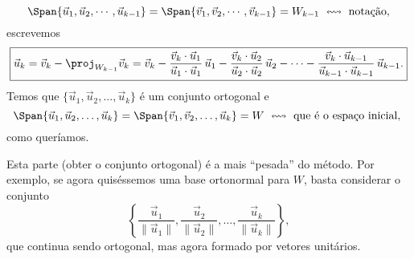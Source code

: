 \begin{equation}
\Span \{ \vec{u}_1, \vec{u}_2, \cdots, \vec{u}_{k-1} \} = \Span \{ \vec{v}_1, \vec{v}_2, \cdots, \vec{v}_{k-1} \} = W_{k-1} \ \leftrightsquigarrow \text{ notação,}
\end{equation} escrevemos
\begin{equation}
\boxed{\vec{u}_k = \vec{v}_k - \proj_{W_{k-1}} \vec{v}_k = \vec{v}_k - \frac{\vec{v}_k \cdot \vec{u}_1}{\vec{u}_1 \cdot \vec{u}_1} \, \vec{u}_1 - \frac{\vec{v}_k \cdot \vec{u}_2}{\vec{u}_2 \cdot \vec{u}_2} \, \vec{u}_2 - \cdots - \frac{\vec{v}_k \cdot \vec{u}_{k-1}}{\vec{u}_{k-1} \cdot \vec{u}_{k-1}} \, \vec{u}_{k-1}.}
\end{equation} Temos que $\{\vec{u}_1, \vec{u}_2, \dots, \vec{u}_k\}$ é um conjunto ortogonal e
\begin{equation}
\Span \{ \vec{u}_1, \vec{u}_2, \dots, \vec{u}_k \} = \Span \{ \vec{v}_1, \vec{v}_2, \dots, \vec{u}_k \} = W \ \leftrightsquigarrow \text{ que é o espaço inicial, }
\end{equation} como queríamos.

Esta parte (obter o conjunto ortogonal) é a mais ``pesada'' do método. Por exemplo, se agora quiséssemos uma base ortonormal para $W$, basta considerar o conjunto
\begin{equation}
\left\{ \frac{\vec{u}_1}{\|\vec{u}_1\|}, \frac{\vec{u}_2}{\|\vec{u}_2\|}, \dots, \frac{\vec{u}_k}{\|\vec{u}_k\|} \right\},
\end{equation} que continua sendo ortogonal, mas agora formado por vetores unitários.




